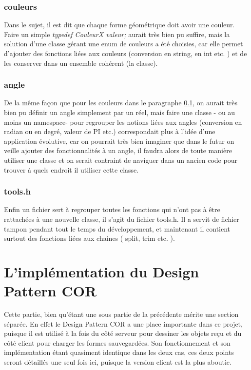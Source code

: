 \documentclass[10pt,a4paper]{report}
\begin{document}
\begin{spacing}{0.8}
\subsection{couleurs}\label{couleurs}
Dans le sujet, il est dit que chaque forme géométrique doit avoir une couleur.
Faire un simple \textit{typedef CouleurX valeur;} aurait très bien pu suffire, mais la solution d'une classe gérant une enum de couleurs a été choisies, car elle permet d'ajouter des fonctions liées aux couleurs (conversion en string, en int etc. ) et de les conserver dans un ensemble cohérent (la classe).

\subsection{angle}
De la même façon que pour les couleurs dans le paragraphe \ref{couleurs}, on aurait très bien pu définir un angle simplement par un réel, mais faire une classe - ou au moins un namespace- pour regrouper les notions liées aux angles (conversion en radian ou en degré, valeur de PI etc.) correspondait plus à l'idée d'une application évolutive, car on pourrait très bien imaginer que dans le futur on veille ajouter des fonctionnalités à un angle, il faudra alors de toute manière utiliser une classe et on serait contraint de naviguer dans un ancien code pour trouver à quels endroit il utiliser cette classe.

\subsection{tools.h}
Enfin un fichier sert à regrouper toutes les fonctions qui n'ont pas à être rattachées à une nouvelle classe, il s'agit du fichier tools.h. Il a servit de fichier tampon pendant tout le temps du développement, et maintenant il contient surtout des fonctions liées aux chaines ( split, trim etc. ).

\chapter{L'implémentation du Design Pattern COR}\label{COR}
Cette partie, bien qu'étant une sous partie de la précédente mérite une section séparée.
En effet le Design Pattern COR a une place importante dans ce projet, puisque il est utilisé à la fois du côté serveur pour dessiner les objets reçu et du côté client pour charger les formes sauvegardées. Son fonctionnement et son implémentation étant quasiment identique dans les deux cas, ces deux points seront détaillés une seul fois ici, puisque la version client est la plus aboutie.

\end{spacing}
\end{document}
